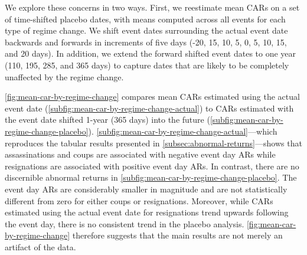 \documentclass[12pt,final,fleqn]{article}
\theoremstyle{plain}
\begin{document}
We explore these concerns in two ways. First, we reestimate mean CARs on a set of time-shifted placebo dates, with means computed across all events for each type of regime change. We shift event dates surrounding the actual event date backwards and forwards in increments of five days (-20, 15, 10, 5, 0, 5, 10, 15, and 20 days). In addition, we extend the forward shifted event dates to one year (110, 195, 285, and 365 days) to capture dates that are likely to be completely unaffected by the regime change. 

\autoref{fig:mean-car-by-regime-change} compares mean CARs estimated using the actual event date (\autoref{subfig:mean-car-by-regime-change-actual}) to CARs estimated with the event date shifted 1-year (365 days) into the future (\autoref{subfig:mean-car-by-regime-change-placebo}). \autoref{subfig:mean-car-by-regime-change-actual}---which reproduces the tabular results presented in \autoref{subsec:abnormal-returns}---shows that assassinations and coups are associated with negative event day ARs while resignations are associated with positive event day ARs. In contrast, there are no discernible abnormal returns in \autoref{subfig:mean-car-by-regime-change-placebo}. The event day ARs are considerably smaller in magnitude and are not statistically different from zero for either coups or resignations. Moreover, while CARs estimated using the actual event date for resignations trend upwards following the event day, there is no consistent trend in the placebo analysis. \autoref{fig:mean-car-by-regime-change} therefore suggests that the main results are not merely an artifact of the data.  
\end{document}
